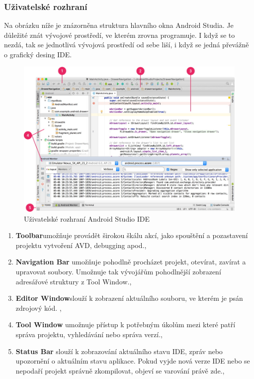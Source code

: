 \documentclass{vskpou} %
\begin{document}
\subsubsection{Uživatelské rozhraní}
Na obrázku níže je znázorněna struktura hlavního okna Android Studia. Je důležité znát vývojové prostředí, ve kterém zrovna programuje. I když se to nezdá, tak se jednotlivá vývojová prostředí od sebe liší, i když se jedná převážně o grafický desing IDE.
 \begin{figure}[h!]
\centering
\includegraphics[scale=0.5]{images/6.jpg}
\caption{Uživatelské rozhraní Android Studio IDE}
\label{6}
\end{figure}


\begin{enumerate}
\item \textbf{Toolbar}umožňuje provádět širokou škálu akcí, jako spouštění a pozastavení projektu vytvoření AVD, debugging apod.\cite{1},\cite{17} 

\item \textbf{Navigation Bar} umožňuje pohodlně procházet projekt, otevírat, zavírat a upravovat soubory. Umožnuje tak vývojářům pohodlnější zobrazení adresářové struktury z Tool Window.\cite{1},\cite{17} 
\item \textbf{Editor Window}slouží k zobrazení aktuálního souboru, ve kterém je psán zdrojový kód. \cite{1},\cite{17} 
\item \textbf{Tool Window} umožnuje přístup k potřebným úkolům mezi které patří správa projektu, vyhledávání nebo správa verzí.\cite{1},\cite{17}  
\item \textbf{Status Bar} slouží k zobrazování aktuálního stavu IDE, zpráv nebo upozornění o aktuálním stavu aplikace. Pokud vyjde nová verze IDE nebo se nepodaří projekt správně zkompilovat, objeví se varování právě zde.\cite{1},\cite{17} 
\end{enumerate}
\end{document}
